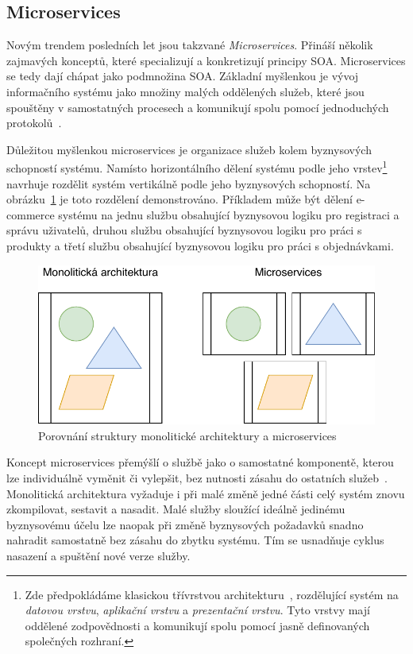 \subsection{Microservices}

Novým trendem posledních let jsou takzvané \textit{Microservices}.
Přináší několik zajmavých konceptů, které specializují a konkretizují
principy SOA. Microservices se tedy dají chápat jako podmnožina
SOA. Základní myšlenkou je vývoj informačního systému jako množiny
malých oddělených služeb, které jsou spouštěny v samostatných procesech
a komunikují spolu pomocí jednoduchých protokolů~\cite{lewis2014microservices}.

Důležitou myšlenkou microservices je organizace služeb kolem
byznysových schopností systému. Namísto horizontálního dělení systému
podle jeho vrstev\footnote{
Zde předpokládáme klasickou třívrstvou architekturu~\cite{fowler2002patterns},
rozdělující systém na \textit{datovou vrstvu}, \textit{aplikační vrstvu}
a \textit{prezentační vrstvu}. Tyto vrstvy mají oddělené zodpovědnosti a komunikují
spolu pomocí jasně definovaných společných rozhraní.
} navrhuje rozdělit systém vertikálně podle jeho byznysových schopností.
Na obrázku~\ref{fig:monolith-vs-microservices} je toto rozdělení demonstrováno.
Příkladem může být dělení e-commerce systému na jednu službu obsahující byznysovou
logiku pro registraci a správu uživatelů, druhou službu obsahující byznysovou logiku
pro práci s produkty a třetí službu obsahující byznysovou logiku pro práci
s objednávkami.

\begin{figure}
    \centering
    \includegraphics[keepaspectratio=true, width=0.5\linewidth]{figures/monolith-vs-microservices.pdf}
    \caption{Porovnání struktury monolitické architektury a microservices}
    \label{fig:monolith-vs-microservices}
\end{figure}

Koncept microservices přemýšlí o službě jako o samostatné komponentě,
kterou lze individuálně vyměnit či vylepšit, bez nutnosti zásahu do
ostatních služeb~\cite{lewis2014microservices}. Monolitická architektura
vyžaduje i při malé změně jedné části celý systém znovu zkompilovat, sestavit
a nasadit. Malé služby sloužící ideálně jedinému byznysovému účelu lze naopak
při změně byznysových požadavků snadno nahradit samostatně bez zásahu do zbytku
systému. Tím se usnadňuje cyklus nasazení a spuštění nové verze služby.

